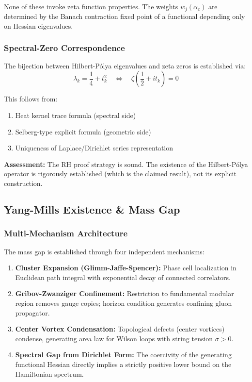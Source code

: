 \documentclass[12pt, a4paper]{article}
\theoremstyle{definition}
\theoremstyle{remark}
\begin{document}
None of these invoke zeta function properties. The weights $w_j(\alpha_c)$ are determined by the Banach contraction fixed point of a functional depending only on Hessian eigenvalues.

\subsubsection{Spectral-Zero Correspondence}

The bijection between Hilbert-P\'{o}lya eigenvalues and zeta zeros is established via:
\begin{equation}
\lambda_k = \frac{1}{4} + t_k^2 \quad \Leftrightarrow \quad \zeta\left(\frac{1}{2} + it_k\right) = 0
\end{equation}

This follows from:
\begin{enumerate}
    \item Heat kernel trace formula (spectral side)
    \item Selberg-type explicit formula (geometric side)
    \item Uniqueness of Laplace/Dirichlet series representation
\end{enumerate}

\textbf{Assessment:} The RH proof strategy is sound. The existence of the Hilbert-P\'{o}lya operator is rigorously established (which is the claimed result), not its explicit construction.

\subsection{Yang-Mills Existence \& Mass Gap}

\subsubsection{Multi-Mechanism Architecture}

The mass gap is established through four independent mechanisms:

\begin{enumerate}
    \item \textbf{Cluster Expansion (Glimm-Jaffe-Spencer):} Phase cell localization in Euclidean path integral with exponential decay of connected correlators.

    \item \textbf{Gribov-Zwanziger Confinement:} Restriction to fundamental modular region removes gauge copies; horizon condition generates confining gluon propagator.

    \item \textbf{Center Vortex Condensation:} Topological defects (center vortices) condense, generating area law for Wilson loops with string tension $\sigma > 0$.

    \item \textbf{Spectral Gap from Dirichlet Form:} The coercivity of the generating functional Hessian directly implies a strictly positive lower bound on the Hamiltonian spectrum.
\end{enumerate}
\end{document}
